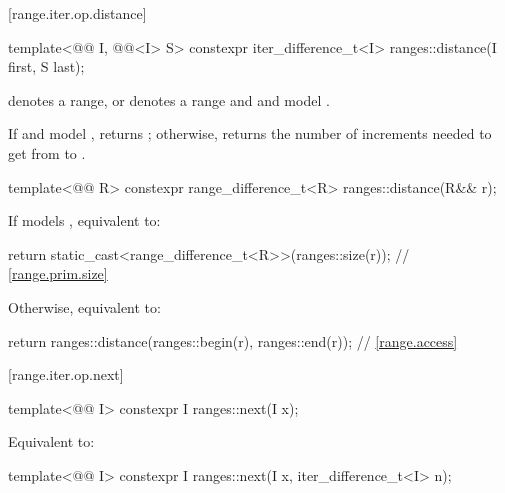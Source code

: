 [range.iter.op.distance]{}
%
\begin{itemdecl}
template<@@ I, @@<I> S>
  constexpr iter_difference_t<I> ranges::distance(I first, S last);
\end{itemdecl}

\begin{itemdescr}
\pnum
\expects
{} denotes a range, or
 denotes a range and
 and  model
.

\pnum
\effects
If  and  model ,
returns ;
otherwise, returns the number of increments needed to get from
to
.
\end{itemdescr}

%
\begin{itemdecl}
template<@@ R>
  constexpr range_difference_t<R> ranges::distance(R&& r);
\end{itemdecl}

\begin{itemdescr}
\pnum
\effects
If  models , equivalent to:
\begin{codeblock}
return static_cast<range_difference_t<R>>(ranges::size(r));     // \ref{range.prim.size}
\end{codeblock}
Otherwise, equivalent to:
\begin{codeblock}
return ranges::distance(ranges::begin(r), ranges::end(r));      // \ref{range.access}
\end{codeblock}
\end{itemdescr}

[range.iter.op.next]{}

%
\begin{itemdecl}
template<@@ I>
  constexpr I ranges::next(I x);
\end{itemdecl}

\begin{itemdescr}
\pnum
\effects
Equivalent to: 
\end{itemdescr}

%
\begin{itemdecl}
template<@@ I>
  constexpr I ranges::next(I x, iter_difference_t<I> n);
\end{itemdecl}

